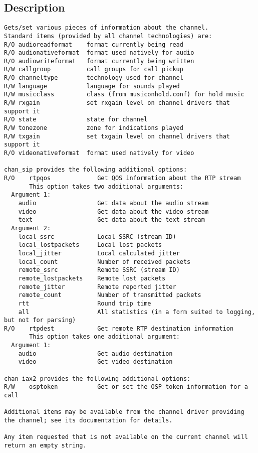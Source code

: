 \subsection{Description}
\begin{verbatim}
Gets/set various pieces of information about the channel.
Standard items (provided by all channel technologies) are:
R/O	audioreadformat    format currently being read
R/O	audionativeformat  format used natively for audio
R/O	audiowriteformat   format currently being written
R/W	callgroup          call groups for call pickup
R/O	channeltype        technology used for channel
R/W	language           language for sounds played
R/W	musicclass         class (from musiconhold.conf) for hold music
R/W	rxgain             set rxgain level on channel drivers that support it
R/O	state              state for channel
R/W	tonezone           zone for indications played
R/W	txgain             set txgain level on channel drivers that support it
R/O	videonativeformat  format used natively for video

chan_sip provides the following additional options:
R/O    rtpqos             Get QOS information about the RTP stream
       This option takes two additional arguments:
  Argument 1:
    audio                 Get data about the audio stream
    video                 Get data about the video stream
    text                  Get data about the text stream
  Argument 2:
    local_ssrc            Local SSRC (stream ID)
    local_lostpackets     Local lost packets
    local_jitter          Local calculated jitter
    local_count           Number of received packets
    remote_ssrc           Remote SSRC (stream ID)
    remote_lostpackets    Remote lost packets
    remote_jitter         Remote reported jitter
    remote_count          Number of transmitted packets
    rtt                   Round trip time
    all                   All statistics (in a form suited to logging, but not for parsing)
R/O    rtpdest            Get remote RTP destination information
       This option takes one additional argument:
  Argument 1:
    audio                 Get audio destination
    video                 Get video destination

chan_iax2 provides the following additional options:
R/W    osptoken           Get or set the OSP token information for a call

Additional items may be available from the channel driver providing
the channel; see its documentation for details.

Any item requested that is not available on the current channel will
return an empty string.

\end{verbatim}


